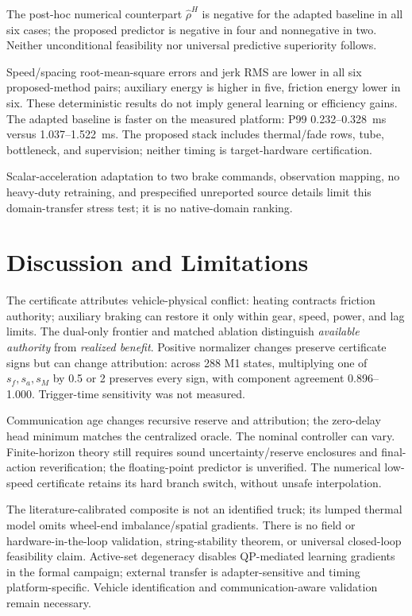 The post-hoc numerical counterpart $\widehat{\rho}^{H}$ is negative for the adapted baseline in all six cases; the proposed predictor is negative in four and nonnegative in two. Neither unconditional feasibility nor universal predictive superiority follows.

Speed/spacing root-mean-square errors and jerk RMS are lower in all six proposed-method pairs; auxiliary energy is higher in five, friction energy lower in six. These deterministic results do not imply general learning or efficiency gains. The adapted baseline is faster on the measured platform: P99 0.232--0.328~ms versus 1.037--1.522~ms. The proposed stack includes thermal/fade rows, tube, bottleneck, and supervision; neither timing is target-hardware certification.

Scalar-acceleration adaptation to two brake commands, observation mapping, no heavy-duty retraining, and prespecified unreported source details limit this domain-transfer stress test; it is no native-domain ranking.

\section{Discussion and Limitations}
The certificate attributes vehicle-physical conflict: heating contracts friction authority; auxiliary braking can restore it only within gear, speed, power, and lag limits. The dual-only frontier and matched ablation distinguish \emph{available authority} from \emph{realized benefit}. Positive normalizer changes preserve certificate signs but can change attribution: across 288 M1 states, multiplying one of $s_f,s_a,s_M$ by 0.5 or 2 preserves every sign, with component agreement 0.896--1.000. Trigger-time sensitivity was not measured.

Communication age changes recursive reserve and attribution; the zero-delay head minimum matches the centralized oracle. The nominal controller can vary. Finite-horizon theory still requires sound uncertainty/reserve enclosures and final-action reverification; the floating-point predictor is unverified. The numerical low-speed certificate retains its hard branch switch, without unsafe interpolation.

The literature-calibrated composite is not an identified truck; its lumped thermal model omits wheel-end imbalance/spatial gradients. There is no field or hardware-in-the-loop validation, string-stability theorem, or universal closed-loop feasibility claim. Active-set degeneracy disables QP-mediated learning gradients in the formal campaign; external transfer is adapter-sensitive and timing platform-specific. Vehicle identification and communication-aware validation remain necessary.
